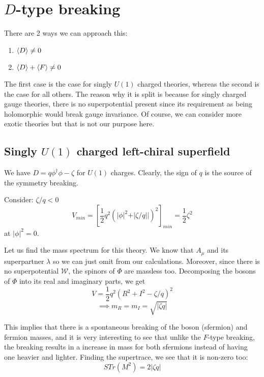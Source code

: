 \section{$D$-type breaking}
\label{ch:14:d-type breaking}
There are 2 ways we can approach this:
\begin{enumerate}
    \item $\braket{D} \neq 0$
    \item $\braket{D} + \braket{F} \neq 0$
\end{enumerate}

The first case is the case for singly $U(1)$ charged theories, whereas the second is the case for all others. The reason why it is split is because for singly charged gauge theories, there is no superpotential present since its requirement as being holomorphic would break gauge invariance. Of course, we can consider more exotic theories but that is not our purpose here.
\subsection{Singly $U(1)$ charged left-chiral superfield}
\label{ch:14:d-type breaking:singly u1 charged left-chiral superfield}
We have $D = q\phi^\dagger\phi - \zeta$ for $U(1)$ charges. Clearly, the sign of $q$ is the source of the symmetry breaking.

Consider: $\zeta / q < 0$
\begin{equation}
    V_{min} = \left[ \frac{1}{2} q^2 (\vert\phi\vert^2 + \vert\zeta/q\vert\vert )^2 \right]_{min} = \frac{1}{2} \zeta^2
\end{equation}
at $\vert\phi\vert^2 = 0$.

Let us find the mass spectrum for this theory. We know that $A_\mu$ and its superpartner $\lambda$ so we can just omit from our calculations. Moreover, since there is no superpotential $\mathcal{W}$, the spinors of $\Phi$ are massless too. Decomposing the bosons of $\Phi$ into its real and imaginary parts, we get
\begin{equation}
    V = \frac{1}{2} q^2 (R^2 + I^2 - \zeta / q )^2
\end{equation}
\begin{equation}
    \implies m_R = m_I = \sqrt{\vert \zeta q \vert}
\end{equation}

This implies that there is a spontaneous breaking of the boson (sfermion) and fermion masses, and it is very interesting to see that unlike the $F$-type breaking, the breaking results in a increase in mass for both sfermions instead of having one heavier and lighter. Finding the supertrace, we see that it is non-zero too:
\begin{equation}
    STr(M^2) = 2\vert\zeta q \vert
\end{equation}

